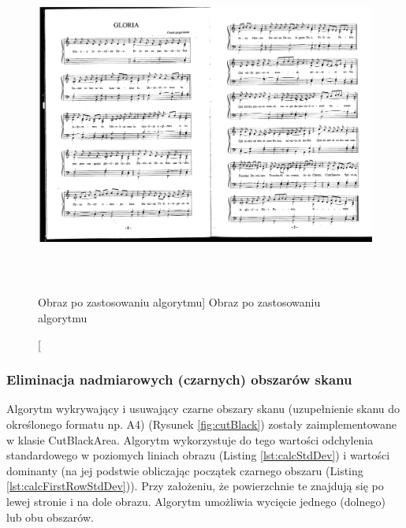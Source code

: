 \documentclass[a4paper,12pt]{article}
\newcommand\spacingIndent{2.2em}
\begin{document}
		        \begin{figure}[!ht]  
    			    \begin{center}
    				    \includegraphics[height=10.5cm, frame] {image//exampleImage//001_b.png} 
    			    \end{center}
	    		    \caption
    			        [Obraz po zastosowaniu algorytmu]  
	    		        {Obraz po zastosowaniu algorytmu}  
	            \end{figure}
		
		\subsubsection{Eliminacja nadmiarowych (czarnych) obszarów skanu}
			\hspace{\spacingIndent} 
			Algorytm wykrywający i usuwający czarne obszary skanu (uzupełnienie skanu do określonego formatu np. A4) (Rysunek \ref{fig:cutBlack}) zostały  zaimplementowane w klasie CutBlackArea. Algorytm wykorzystuje do tego           wartości odchylenia standardowego w poziomych liniach obrazu (Listing \ref{lst:calcStdDev}) i wartości     dominanty (na jej podstwie obliczając początek czarnego obszaru (Listing \ref{lst:calcFirstRowStdDev})). Przy założeniu, że powierzchnie te znajdują się po lewej         stronie i na dole obrazu. Algorytm umożliwia wycięcie jednego (dolnego)     lub obu obszarów. 
			
\end{document}
